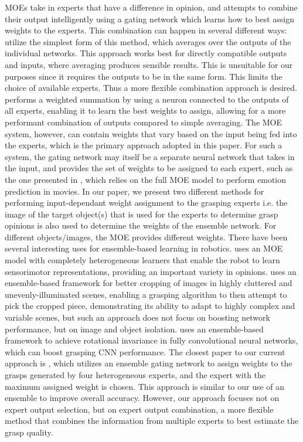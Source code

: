 \documentclass[letterpaper, 10 pt, conference]{ieeeconf}
\begin{document}
MOEs take in experts that have a difference in opinion, and attempts to combine their output intelligently using a gating network which learns how to best assign weights to the experts.  This combination can happen in several different ways:  \cite{fundus} utilize the simplest form of this method, which averages over the outputs of the individual networks. This approach works best for directly compatible outputs and inputs, where averaging produces sensible results. This is unsuitable for our purposes since it requires the outputs to be in the same form. This limits the choice of available experts. Thus a more flexible combination approach is desired. \cite{ASC} performs a weighted summation by using a neuron connected to the outputs of all experts, enabling it to learn the best weights to assign, allowing for a more performant combination of outputs compared to simple averaging.  The MOE system, however, can contain weights that vary based on the input being fed into the experts, which is the primary approach adopted in this paper. For such a system, the gating network may itself be a separate neural network that takes in the input, and provides the set of weights to be assigned to each expert, such as the one presented in \cite{MOEMovie}, which relies on the full MOE model to perform emotion prediction in movies.  In our paper, we present two different methods for performing input-dependant weight assignment to the grasping experts i.e. the image of the target object(s) that is used for the experts to determine grasp opinions is also used to determine the weights of the ensemble network. For different objects/images, the MOE provides different weights. There have been several interesting uses for ensemble-based learning in robotics. \cite{reinforcementSensorimotor} uses an MOE model with completely heterogeneous learners that enable the robot to learn sensorimotor representations, providing an important variety in opinions.  \cite{randomCroppingEnsemble} uses an ensemble-based framework for better cropping of images in highly cluttered and unevenly-illuminated scenes, enabling a grasping algorithm to then attempt to pick the cropped piece, demonstrating its ability to adapt to highly complex and variable scenes, but such an approach does not focus on boosting network performance, but on image and object isolation.  \cite{rotationalInvarianceEnsemble} uses an ensemble-based framework to achieve rotational invariance in fully convolutional neural networks, which can boost grasping CNN performance. The closest paper to our current approach is \cite{asif2018ensemblenet}, which utilizes an ensemble gating network to assign weights to the grasps generated by four heterogeneous experts, and the expert with the maximum assigned weight is chosen.  This approach is similar to our use of an ensemble to improve overall accuracy.  However, our approach focuses not on expert output selection, but on expert output combination, a more flexible method that combines the information from multiple experts to best estimate the grasp quality.
\end{document}
